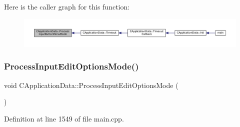 Here is the caller graph for this function\+:\nopagebreak
\begin{figure}[H]
\begin{center}
\leavevmode
\includegraphics[width=350pt]{classCApplicationData_a10e56e4604f1f0823af659a7989fea9d_icgraph}
\end{center}
\end{figure}
\hypertarget{classCApplicationData_a345f47a19a5abcc9aeeb6b02b4aaf31b}{}\label{classCApplicationData_a345f47a19a5abcc9aeeb6b02b4aaf31b} 
\subsubsection{\texorpdfstring{Process\+Input\+Edit\+Options\+Mode()}{ProcessInputEditOptionsMode()}}
{\footnotesize\ttfamily void C\+Application\+Data\+::\+Process\+Input\+Edit\+Options\+Mode (\begin{DoxyParamCaption}{ }\end{DoxyParamCaption})\hspace{0.3cm}{\ttfamily [protected]}}



Definition at line 1549 of file main.\+cpp.


